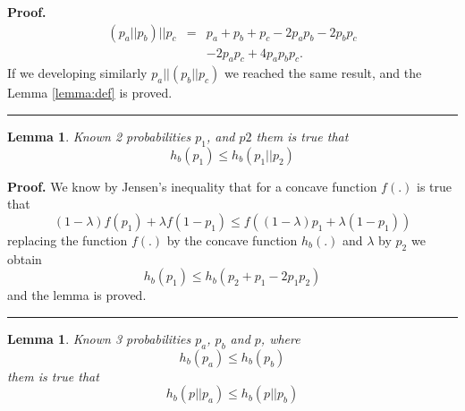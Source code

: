 \documentclass[a4paper,10pt]{article}
\newtheorem{mylemma}[mytheorem]{Lemma}
\newenvironment{myproof}[1][Proof]{\textbf{#1.} }{\ \rule{0.5em}{0.5em}}
\begin{document}
\begin{myproof}
\label{proof:def}
\begin{equation} \label{eq:def2}
\begin{matrix}
(p_a || p_b)||p_c & = & p_a + p_b + p_c -2 p_a p_b -2 p_b p_c  \\
~                 & ~ & -2 p_a p_c + 4 p_a p_b p_c.
\end{matrix}
\end{equation} 
If we developing similarly $p_a || (p_b||p_c)$ we reached the same result, and 
the Lemma \ref{lemma:def} is proved.
\end{myproof}
\begin{mdframed}[style=MDFStyGrayScreen]
\begin{mylemma}
\label{lemma:psimple} 
Known 2 probabilities $p_1$, and $p2$
them is true that
\begin{equation} \label{eq:psimple1}
h_{b}(p_1) \leq h_{b}(p_1||p_2) 
\end{equation}
\end{mylemma}
\end{mdframed}
\begin{myproof}
\label{proof:psimple} 
We know  by Jensen's inequality \cite{cover} that for a concave function $f(.)$ 
is true that
\begin{equation} \label{eq:psimple2}
(1-\lambda) f(p_1) +\lambda f(1-p_1)  \leq f((1-\lambda) p_1 +\lambda (1-p_1))
\end{equation}
replacing the function $f(.)$ by the concave function $h_{b}(.)$ and $\lambda$ 
by $p_2$ we obtain
\begin{equation} \label{eq:psimple3}
h_{b}(p_1)  \leq h_{b}(p_2 + p_1 - 2 p_1 p_2)
\end{equation}
and the lemma is proved.
\end{myproof}
\begin{mdframed}[style=MDFStyGrayScreen]
\begin{mylemma}
\label{lemma:ppapb} 
Known 3 probabilities $p_a$, $p_b$ and $p$, where
\begin{equation} \label{eq:ppapb0}
h_{b}(p_a) \leq h_{b}(p_b) 
\end{equation}
them is true that
\begin{equation} \label{eq:ppapb1}
h_{b}(p||p_a) \leq h_{b}(p||p_b) 
\end{equation}
\end{mylemma}
\end{mdframed}
\end{document}
